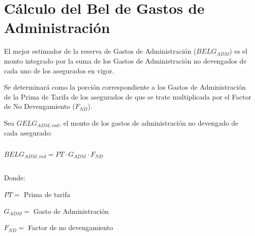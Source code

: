 \documentclass[11pt,twoside,openright,spanish]{report}
\numberwithin{equation}{chapter}
\numberwithin{figure}{chapter}
\numberwithin{table}{chapter}
\begin{document}
	\doublespacing
	\section{Cálculo del Bel de Gastos de Administración}
	\doublespacing
	El mejor estimador de la reserva de Gastos de Administración ($BELG_{ADM}$) es el monto integrado por la suma de los Gastos de Administración no devengados de cada uno de los asegurados en vigor.
	
	\doublespacing
	
	Se determinará como la porción correspondiente a los Gastos de Administración de la Prima de Tarifa de los asegurados de que se trate multiplicada por el Factor de No Devengamiento ($F_{ND}$). 
\begin{comment}
Para Salud Individual Dental, se tomara el porcentaje de gasto de administración del mercado proporcionado por la Comisión Nacional de Seguros y Fianzas.
\end{comment}	
	\doublespacing
	
	Sea $GELG_{ADM,ind}$, el monto de los gastos de administración no devengado de cada asegurado:
	
	\doublespacing

$ $

\doublespacing

	{\centering	

\begin{comment}	
$
BELG_{ADM,ind}=\begin{cases}
PT \cdot G_{ADM} \cdot F_{ND}, & \text{$g \neq Salud  Dental  Individual$}.\\
PT \cdot \alpha_{i} \cdot F_{ND}, & \text{$g = Salud  Dental  Individual$}.
\end{cases}
$
\end{comment}


$BELG_{ADM,ind}=	PT \cdot G_{ADM} \cdot F_{ND}$




		\noindent
	
}
	

	\doublespacing

$ $

\doublespacing

	Donde:
	\doublespacing
	
    $PT=$ Prima de tarifa
    
    $G_{ADM}^{}=$ Gasto de Administración
	
	$F_{ND}^{}=$ Factor de no devengamiento
\begin{comment}	
	$\alpha_{i}^{}=$ Porcentaje de gasto de administración con información de Mercado
\end{comment}	
	\doublespacing
\end{document}
